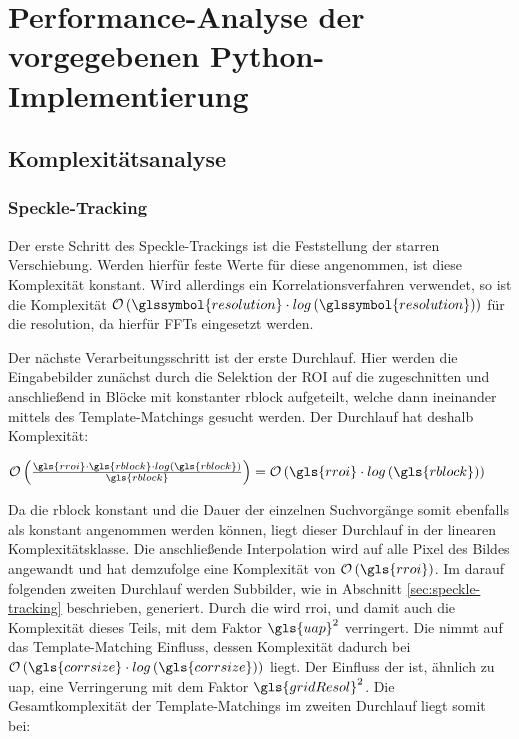 \chapter{Performance-Analyse der vorgegebenen Python-Implementierung}

\section{Komplexitätsanalyse}

\subsection{Speckle-Tracking}

Der erste Schritt des Speckle-Trackings ist die Feststellung der starren Verschiebung. Werden hierfür feste Werte für diese angenommen, ist diese Komplexität konstant. Wird allerdings ein Korrelationsverfahren verwendet, so ist die Komplexität $\mathcal{O}\left(\glssymbol{resolution} \cdot log\left(\glssymbol{resolution}\right)\right)$ für die \gls{resolution}, da hierfür \glspl{FFT} eingesetzt werden. 

Der nächste Verarbeitungsschritt ist der erste Durchlauf. Hier werden die Eingabebilder zunächst durch die Selektion der \gls{ROI} auf die   zugeschnitten und anschließend in Blöcke mit konstanter \gls{rblock} aufgeteilt, welche dann ineinander mittels des Template-Matchings gesucht werden. Der Durchlauf hat deshalb Komplexität: 

\begin{center}
	$\mathcal{O}\left(\frac{\gls{rroi} \cdot \gls{rblock} \cdot log\left(\gls{rblock}\right)}{\gls{rblock}}\right) = \mathcal{O}\left(\gls{rroi} \cdot log\left(\gls{rblock}\right)\right)$
\end{center}

Da die \gls{rblock} konstant und die Dauer der einzelnen Suchvorgänge somit ebenfalls als konstant angenommen werden können, liegt dieser Durchlauf in der linearen Komplexitätsklasse.  Die anschließende Interpolation wird auf alle Pixel des Bildes angewandt und hat demzufolge eine Komplexität von $\mathcal{O}\left(\gls{rroi}\right)$. Im darauf folgenden zweiten Durchlauf werden Subbilder, wie in Abschnitt \ref{sec:speckle-tracking} beschrieben, generiert. Durch die   wird \gls{rroi}, und damit auch die Komplexität dieses Teils, mit dem Faktor $\gls{uap}^2$ verringert. Die   nimmt auf das Template-Matching Einfluss, dessen Komplexität dadurch bei $\mathcal{O}\left(\gls{corrsize} \cdot log\left(\gls{corrsize}\right)\right)$ liegt. Der Einfluss der   ist, ähnlich zu \gls{uap}, eine Verringerung mit dem Faktor $\gls{gridResol}^2$. Die Gesamtkomplexität der Template-Matchings im zweiten Durchlauf liegt somit bei:

